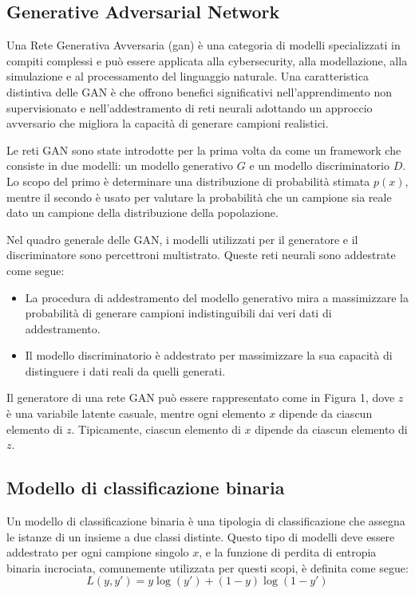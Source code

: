 \newpage
\subsection{Generative Adversarial Network}
Una Rete Generativa Avversaria (\gls{gan}) è una categoria di modelli specializzati in compiti complessi e può essere applicata alla \gls{cybersecurity}, alla modellazione, alla simulazione e al processamento del linguaggio naturale. Una caratteristica distintiva delle GAN è che offrono benefici significativi nell'apprendimento non supervisionato e nell'addestramento di reti neurali adottando un approccio avversario che migliora la capacità di generare campioni realistici.

Le reti GAN sono state introdotte per la prima volta da  come un framework che consiste in due modelli: un modello generativo \( G \) e un modello discriminatorio \( D \). Lo scopo del primo è determinare una distribuzione di probabilità stimata \( p(x) \), mentre il secondo è usato per valutare la probabilità che un campione sia reale dato un campione della distribuzione della popolazione.

Nel quadro generale delle GAN, i modelli utilizzati per il generatore e il discriminatore sono percettroni multistrato. Queste reti neurali sono addestrate come segue:
\begin{itemize}
  \item La procedura di addestramento del modello generativo mira a massimizzare la probabilità di generare campioni indistinguibili dai veri dati di addestramento.
  \item Il modello discriminatorio è addestrato per massimizzare la sua capacità di distinguere i dati reali da quelli generati.
\end{itemize}

Il generatore di una rete GAN può essere rappresentato come in Figura 1, dove \( z \) è una variabile latente casuale, mentre ogni elemento \( x \) dipende da ciascun elemento di \( z \). Tipicamente, ciascun elemento di \( x \) dipende da ciascun elemento di \( z \).

\subsection{Modello di classificazione binaria}
Un modello di classificazione binaria è una tipologia di classificazione che assegna le istanze di un insieme a due classi distinte. Questo tipo di modelli deve essere addestrato per ogni campione singolo \( x \), e la funzione di perdita di entropia binaria incrociata, comunemente utilizzata per questi scopi, è definita come segue:
\[
L(y, y') = y \log(y') + (1 - y) \log(1 - y')
\]

